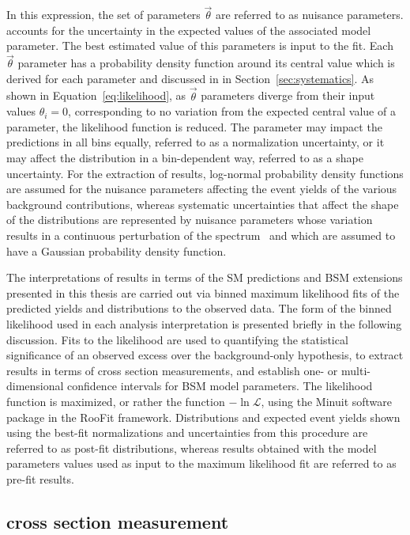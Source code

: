 In this expression, 
the set of parameters $\vec{\theta}$ are referred to as nuisance parameters.
accounts for the uncertainty in the expected values of the associated model parameter.
The best estimated value of this parameters is input to the fit. 
Each $\vec{\theta}$ parameter has a probability density function around its
central value which is derived for each parameter and discussed in 
in Section~\ref{sec:systematics}.
As shown in Equation~\ref{eq:likelihood}, as $\vec{\theta}$ parameters diverge from
their input values $\theta_i = 0$, corresponding to no variation from the expected 
central value of a parameter, the likelihood function is reduced.
The parameter may impact the predictions in all bins equally,
referred to as a normalization uncertainty, or it may affect the distribution in
a bin-dependent way, referred to as a shape uncertainty.
For the extraction of results, log-normal probability density functions are 
assumed for the nuisance parameters affecting 
the event yields of the various background contributions, whereas systematic uncertainties 
that affect the shape of the distributions are represented by nuisance parameters whose 
variation results in a continuous perturbation of the spectrum~\cite{Prosper:2011zz} and which are assumed 
to have a Gaussian probability density function.

The interpretations of results in terms of 
the SM predictions and BSM extensions presented in this thesis 
are carried out via binned maximum likelihood fits of the predicted yields and distributions
to the observed data. The form of the binned likelihood used in each
analysis interpretation is presented briefly in the following discussion.
Fits to the likelihood are used to 
quantifying the statistical significance of an observed excess over the background-only hypothesis, 
to extract results in terms of cross section measurements, and establish
one- or multi-dimensional confidence intervals for BSM model parameters.
The likelihood function is maximized, or rather the function $-\ln \mathcal{L}$,
using the {\sc Minuit} software package in the {\sc RooFit} framework. Distributions 
and expected event yields
shown using the best-fit normalizations and uncertainties from this procedure
are referred to as post-fit distributions, whereas results obtained with the model parameters 
values used as input to the maximum likelihood fit are referred to as pre-fit results.

\subsection{\WZjj cross section measurement}

